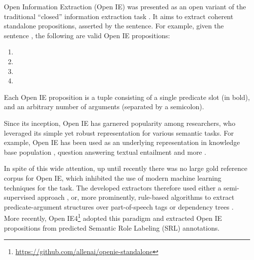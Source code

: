 Open Information Extraction (Open IE)
was presented as an open variant of the traditional ``closed'' information extraction task \cite{etzioni2008open}.
It aims to extract coherent standalone propositions, asserted by the sentence.
For example, given the sentence
,
the following are valid Open IE propositions:
\begin{enumerate}
\item {}
\item {}
\item {}
\item {}
\end{enumerate}
Each Open IE proposition is a tuple consisting of a single predicate slot (in bold), and an arbitrary number of arguments (separated by a semicolon).

Since its inception, Open IE has garnered popularity among researchers, who leveraged  its simple yet robust representation for various semantic tasks.
For example, Open IE has been used as an underlying representation in knowledge base population \cite{2015angeli-openie}, question answering \cite{fader2014open}
textual entailment \cite{Berant:ACL11} and more \cite{Melamud:ACL13,yang2016peak}.

In spite of this wide attention, up until recently there was no large gold reference corpus for Open IE,
which inhibited the use of modern machine learning techniques for the task.
The developed extractors therefore used either a semi-supervised approach \cite{wu2010open,banko2007open}, or, more prominently, rule-based algorithms to extract predicate-argument structures over part-of-speech tags \cite{fader2011identifying} or  dependency trees \cite{mausam2012open,del2013clausie,props2016}.
More recently, Open IE4\footnote{\url{https://github.com/allenai/openie-standalone}} adopted this paradigm and extracted Open IE propositions from predicted Semantic Role Labeling (SRL)
annotations.


